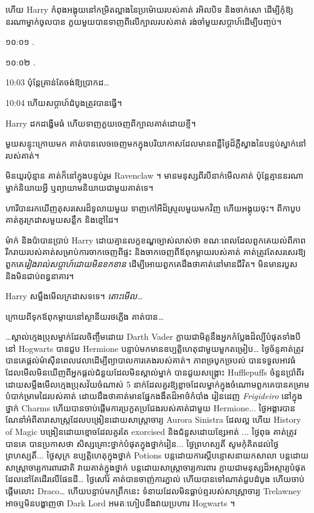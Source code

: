 {{{\later

ហើយ Harry កំពុងអង្គុយនៅកម្រិតល្អាងនៃប្រម៉ោយរបស់គាត់ រអិលបិទ និងចាក់សោ ដើម្បីកុំឱ្យនរណាម្នាក់ចូលបាន ភួយមួយបានទាញពីលើក្បាលរបស់គាត់ រង់ចាំមួយសប្តាហ៍ដើម្បីបញ្ចប់។

១០:០១ .

១០:០២ .

10:03 ប៉ុន្តែគ្រាន់តែចង់ឱ្យប្រាកដ…

10:04 ហើយសប្តាហ៍ដំបូងត្រូវបានធ្វើ។

Harry ដកដង្ហើមធំ ហើយទាញភួយចេញពីក្បាលគាត់ដោយខ្ញី។

មួយសន្ទុះក្រោយមក គាត់បានលេចចេញមកក្នុងបរិយាកាសដែលមានពន្លឺថ្ងៃដ៏ភ្លឺស្វាងនៃបន្ទប់ស្នាក់នៅរបស់គាត់។

មិនយូរប៉ុន្មាន គាត់ក៏នៅក្នុងបន្ទប់រួម Ravenclaw ។ មានមនុស្សពីរបីនាក់មើលគាត់ ប៉ុន្តែគ្មាននរណាម្នាក់និយាយអ្វី ឬព្យាយាមនិយាយជាមួយគាត់ទេ។

ហារី​បាន​រក​ឃើញ​តុ​សរសេរ​ដ៏​ទូលាយ​មួយ ទាញ​កៅអី​ដ៏​ស្រួល​មួយ​មក​វិញ ហើយ​អង្គុយ​ចុះ។ ពីកាបូបគាត់គូរក្រដាសមួយសន្លឹក និងខ្មៅដៃ។

ម៉ាក់ និងប៉ាបានប្រាប់ Harry ដោយគ្មានលក្ខខណ្ឌច្បាស់លាស់ថា ខណៈពេលដែលពួកគេយល់ពីភាពរីករាយរបស់គាត់សម្រាប់ការចាកចេញពីផ្ទះ និងចាកចេញពីឪពុកម្តាយរបស់គាត់ គាត់ត្រូវតែសរសេរឱ្យពួកគេ\emph{រៀងរាល់សប្តាហ៍ដោយមិនខកខាន} ដើម្បីអោយពួកគេដឹងថាគាត់នៅមានជីវិត។ មិន​មាន​របួស និង​មិន​ជាប់​ពន្ធនាគារ។

Harry សម្លឹងមើលក្រដាសទទេ។ \emph{តោះមើល…}

ក្រោយ​ពី​ទុក​ឪពុក​ម្តាយ​នៅ​ស្ថានីយ​រថភ្លើង គាត់​បាន…

…ស្គាល់ក្មេងប្រុសម្នាក់ដែលចិញ្ចឹមដោយ Darth Vader ក្លាយជាមិត្តនឹងអ្នកកំប្លែងដ៏ល្បីបំផុតទាំងបីនៅ Hogwarts បានជួប Hermione បន្ទាប់មកមានឧប្បត្តិហេតុជាមួយមួកតម្រៀប… ថ្ងៃច័ន្ទគាត់ត្រូវបានគេផ្តល់ម៉ាស៊ីនពេលវេលាដើម្បីព្យាបាលការគេងរបស់គាត់។ ភាពច្របូកច្របល់ បានទទួលអាវធំដែលមើលមិនឃើញពីអ្នកផ្តល់ជំនួយដែលមិនស្គាល់ម្នាក់ បានជួយសង្គ្រោះ Hufflepuffs ចំនួនប្រាំពីរដោយសម្លឹងមើលក្មេងប្រុសវ័យចំណាស់ 5 នាក់ដែលគួរឱ្យខ្លាចដែលម្នាក់ក្នុងចំណោមពួកគេបានគម្រាមបំបាក់ម្រាមដៃរបស់គាត់ ដោយដឹងថាគាត់មានផ្នែកងងឹតដ៏អាថ៌កំបាំង រៀនដេញ \emph{Frigideiro} នៅក្នុងថ្នាក់ Charms ហើយបានចាប់ផ្តើមការប្រកួតប្រជែងរបស់គាត់ជាមួយ Hermione... ថ្ងៃអង្គារបានណែនាំអំពីតារាសាស្ត្រដែលបង្រៀនដោយសាស្រ្តាចារ្យ Aurora Sinistra ដែលល្អ ហើយ History of Magic បង្រៀនដោយខ្មោចដែលគួរតែ exorcised និងជំនួសដោយខ្សែអាត់ ... ថ្ងៃពុធ គាត់ត្រូវបានគេ បានប្រកាសថា សិស្សគ្រោះថ្នាក់បំផុតក្នុងថ្នាក់រៀន... ថ្ងៃព្រហស្បតិ៍ សូមកុំគិតដល់ថ្ងៃព្រហស្បតិ៍... ថ្ងៃសុក្រ ឧប្បត្តិហេតុក្នុងថ្នាក់ Potions បន្តដោយការស្តីបន្ទោសនាយកសាលា បន្តដោយសាស្ត្រាចារ្យការពារជាតិ វាយគាត់ក្នុងថ្នាក់ បន្តដោយសាស្ត្រាចារ្យការពារ ក្លាយជាមនុស្សដ៏អស្ចារ្យបំផុតដែលនៅតែដើរលើផែនដី… ថ្ងៃសៅរ៍ គាត់បានចាញ់ការភ្នាល់ ហើយបានទៅណាត់ជួបដំបូង ហើយចាប់ផ្តើមលោះ Draco… ហើយបន្ទាប់មកព្រឹកនេះ ទំនាយដែលមិនធ្លាប់ឮរបស់សាស្រ្តាចារ្យ Trelawney អាចឬមិនបង្ហាញថា Dark Lord អមតៈហៀបនឹងវាយប្រហារ Hogwarts ។

}}}
